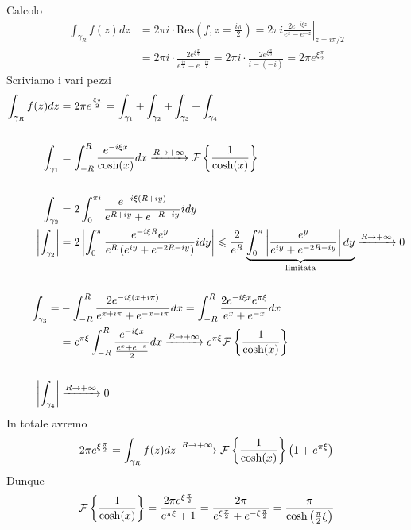 Calcolo
\begin{equation*}
\begin{aligned}
\int _{\gamma _{R}} f(z)dz & =2\pi i\cdotp \mathrm{Res}\left( f,z=\frac{i\pi }{2}\right) =2\pi i\left. \frac{2e^{-i\xi z}}{e^{z} -e^{-z}}\right| _{z=i\pi /2}\\
 & =2\pi i\cdotp \frac{2e^{\xi \frac{\pi }{2}}}{e^{\frac{i\pi }{2}} -e^{-\frac{i\pi }{2}}} =2\pi i\cdotp \frac{2e^{\xi \frac{\pi }{2}}}{i-( -i)} =2\pi e^{\xi \frac{\pi }{2}}
\end{aligned}
\end{equation*}
Scriviamo i vari pezzi
\begin{align*}
\int _{\gamma _{R}} f( z) dz & =2\pi e^{\frac{\xi \pi }{2}} =\int _{\gamma _{1}} +\int _{\gamma _{2}} +\int _{\gamma _{3}} +\int _{\gamma _{4}}\\
 & \\
\int _{\gamma _{1}} & =\int ^{R}_{-R}\frac{e^{-i\xi x}}{\cosh (x)} dx\xrightarrow{R\rightarrow +\infty }\mathcal{F} \left\{\frac{1}{\cosh (x)}\right\}\\
 & \\
\int _{\gamma _{2}} & =2\int ^{\pi i}_{0}\frac{e^{-i\xi (R+iy)}}{e^{R+iy} +e^{-R-iy}} idy\\
\left| \int _{\gamma _{2}}\right|  & =2\left| \int ^{\pi }_{0}\frac{e^{-i\xi R} e^{y}}{e^{R}\left( e^{iy} +e^{-2R-iy}\right)} idy\right| \leqslant \frac{2}{e^{R}}\underbrace{\int ^{\pi }_{0}\left| \frac{e^{y}}{e^{iy} +e^{-2R-iy}}\right| dy}_{\text{limitata}}\xrightarrow{R\rightarrow +\infty } 0\\
 & \\
\int _{\gamma _{3}} = & -\int ^{R}_{-R}\frac{2e^{-i\xi ( x+i\pi )}}{e^{x+i\pi } +e^{-x-i\pi }} dx=\int ^{R}_{-R}\frac{2e^{-i\xi x} e^{\pi \xi }}{e^{x} +e^{-x}} dx\\
 & =e^{\pi \xi }\int ^{R}_{-R}\frac{e^{-i\xi x}}{\frac{e^{x} +e^{-x}}{2}} dx\xrightarrow{R\rightarrow +\infty } e^{\pi \xi }\mathcal{F} \left\{\frac{1}{\cosh (x)}\right\}\\
 & \\
\left| \int _{\gamma _{4}}\right|  & \xrightarrow{R\rightarrow +\infty } 0
\end{align*}
In totale avremo
\begin{equation*}
2\pi e^{\xi \frac{\pi }{2}} =\int _{\gamma _{R}} f( z) dz\xrightarrow{R\rightarrow +\infty }\mathcal{F} \left\{\frac{1}{\cosh (x)}\right\}\left( 1+e^{\pi \xi }\right)
\end{equation*}
Dunque
\begin{equation*}
\mathcal{F} \left\{\frac{1}{\cosh (x)}\right\} =\frac{2\pi e^{\xi \frac{\pi }{2}}}{e^{\pi \xi } +1} =\frac{2\pi }{e^{\xi \frac{\pi }{2}} +e^{-\xi \frac{\pi }{2}}} =\frac{\pi }{\cosh\left(\frac{\pi }{2} \xi \right)}
\end{equation*}
\Soluzione

